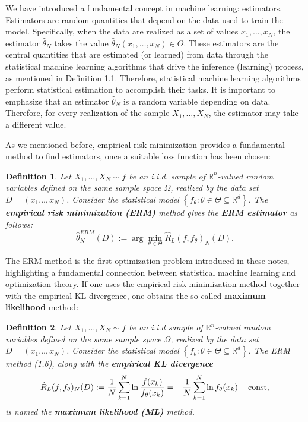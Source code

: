 \documentclass{report}
\newtheorem{definition}{Definition}[chapter]
\begin{document}
We have introduced a fundamental concept in machine learning: estimators. Estimators are random quantities that depend on the data used to train the model. Specifically, when the data are realized as a set of values $x_1,\dots,x_N$, the estimator $\hat{\theta}_N$ takes the value $\hat{\theta}_N(x_1,\dots,x_N) \in \Theta$. These estimators are the central quantities that are estimated (or learned) from data through the statistical machine learning algorithms that drive the inference (learning) process, as mentioned in Definition 1.1. Therefore, statistical machine learning algorithms perform statistical estimation to accomplish their tasks. It is important to emphasize that an estimator $\hat{\theta}_N$ is a random variable depending on data. Therefore, for
every realization of the sample $X_1,\dots,X_N$, the estimator may take a different value.

As we mentioned before, empirical risk minimization provides a fundamental method to find estimators, once a suitable loss function has been chosen:
\begin{definition}
Let $X_1,\dots,X_N \sim f$ be an i.i.d. sample of $\mathbb{R}^n$-valued random variables defined on the same sample space $\Omega$, realized by the data set $D =(x_1\dots,x_N)$. Consider the statistical model $\left\{f_\theta : \theta \in \Theta \subseteq \mathbb{R}^d\right\}$. The \textbf{empirical risk minimization (ERM)} method gives the \textbf{ERM estimator} as follows:
\begin{equation}
\hat{\theta}^{ERM}_N(D) := \arg\min_{\theta \in \Theta}\hat{R}_L(f,f_\theta)_N(D).
\end{equation}
\end{definition}

The ERM method is the first optimization problem introduced in these notes, highlighting a fundamental connection between statistical machine learning and optimization theory. If one uses the empirical risk minimization method together with the empirical KL divergence, one obtains the so-called \textbf{maximum likelihood} method:

\begin{definition}
Let $X_1,\dots,X_N \sim f$ be an i.i.d sample of $\mathbb{R}^n$-valued random variables defined on the same sample space $\Omega$, realized by the data set $D=(x_1\dots,x_N)$. Consider the statistical model $\left\{f_\theta : \theta \in \Theta \subseteq \mathbb{R}^d\right\}$. The ERM method (1.6), along with the \textbf{empirical KL divergence}
\begin{equation}
\hat{R}_L(f,f_\theta)_N(D) := \frac{1}{N}\sum_{k=1}^{N}\ln\frac{f(x_k)}{f_\theta(x_k)} = -\frac{1}{N}\sum_{k=1}^{N}\ln f_\theta(x_k) + \textup{const},
\end{equation}
is named the \textbf{maximum likelihood (ML)} method.
\end{definition}
\end{document}
